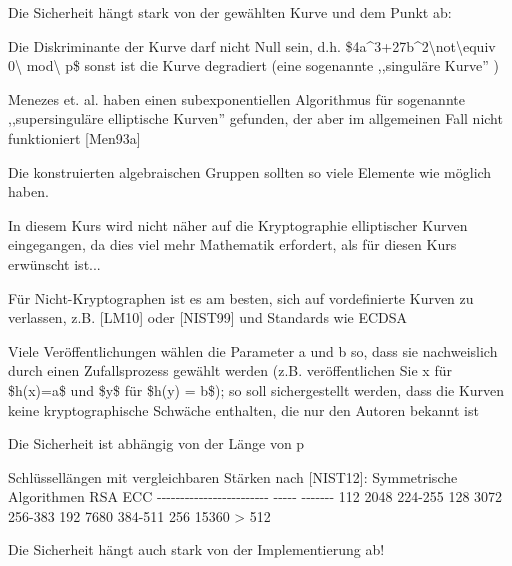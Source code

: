 \documentclass[a4paper]{article}
\begin{document}
\begin{multicols}{3}
      \begin{itemize*}
            \item
            Die Sicherheit hängt stark von der gewählten Kurve und dem Punkt ab:
            \item
            Die Diskriminante der Kurve darf nicht Null sein, d.h.
            \$4a\^{}3+27b\^{}2\textbackslash not\textbackslash equiv
            0\textbackslash{} mod\textbackslash{} p\$ sonst ist die Kurve
            degradiert (eine sogenannte ,,singuläre Kurve'' )
            \item
            Menezes et. al. haben einen subexponentiellen Algorithmus für
            sogenannte ,,supersinguläre elliptische Kurven'' gefunden, der aber im
            allgemeinen Fall nicht funktioniert {[}Men93a{]}
            \item
            Die konstruierten algebraischen Gruppen sollten so viele Elemente wie
            möglich haben.
            \item
            In diesem Kurs wird nicht näher auf die Kryptographie elliptischer
            Kurven eingegangen, da dies viel mehr Mathematik erfordert, als für
            diesen Kurs erwünscht ist...
            \item
            Für Nicht-Kryptographen ist es am besten, sich auf vordefinierte
            Kurven zu verlassen, z.B. {[}LM10{]} oder {[}NIST99{]} und Standards
            wie ECDSA
            \item
            Viele Veröffentlichungen wählen die Parameter a und b so, dass sie
            nachweislich durch einen Zufallsprozess gewählt werden (z.B.
            veröffentlichen Sie x für \$h(x)=a\$ und \$y\$ für \$h(y) = b\$); so
            soll sichergestellt werden, dass die Kurven keine kryptographische
            Schwäche enthalten, die nur den Autoren bekannt ist
            \item
            Die Sicherheit ist abhängig von der Länge von p

            \begin{itemize*}
                  \item Schlüssellängen mit vergleichbaren Stärken nach {[}NIST12{]}: \textbar{} Symmetrische Algorithmen \textbar{} RSA \textbar{} ECC \textbar{} \textbar{} -\/-\/-\/-\/-\/-\/-\/-\/-\/-\/-\/-\/-\/-\/-\/-\/-\/-\/-\/-\/-\/-\/-\/- \textbar{} -\/-\/-\/-\/- \textbar{} -\/-\/-\/-\/-\/-\/- \textbar{} \textbar{} 112 \textbar{} 2048 \textbar{} 224-255 \textbar{} \textbar{} 128 \textbar{} 3072 \textbar{} 256-383 \textbar{} \textbar{} 192 \textbar{} 7680 \textbar{} 384-511 \textbar{} \textbar{} 256 \textbar{} 15360 \textbar{} \textgreater{} 512 \textbar{}
            \end{itemize*}
            \item
            Die Sicherheit hängt auch stark von der Implementierung ab!


\end{itemize*}
\end{multicols}
\end{document}
